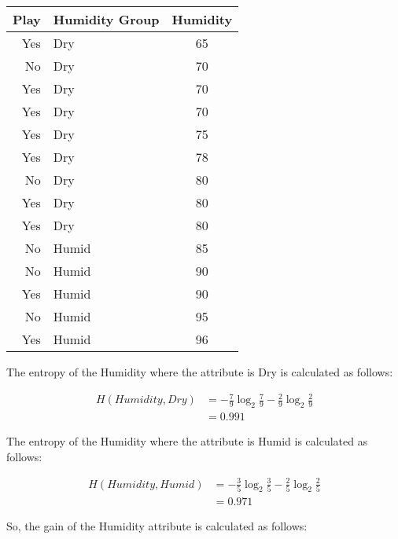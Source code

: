 \documentclass[
  11pt, %
]{assignment}
\begin{document}
\begin{center}
	\begin{tabular}{r | l | c}
		Play & Humidity Group & Humidity \\
		\toprule
		Yes  & Dry            & 65       \\
		No   & Dry            & 70       \\
		Yes  & Dry            & 70       \\
		Yes  & Dry            & 70       \\
		Yes  & Dry            & 75       \\
		Yes  & Dry            & 78       \\
		No   & Dry            & 80       \\
		Yes  & Dry            & 80       \\
		Yes  & Dry            & 80       \\
		No   & Humid          & 85       \\
		No   & Humid          & 90       \\
		Yes  & Humid          & 90       \\
		No   & Humid          & 95       \\
		Yes  & Humid          & 96       \\
	\end{tabular}
\end{center}

The entropy of the Humidity where the attribute is Dry is calculated as follows:

\begin{equation}
	\label{eq:entropy-humidity-dry}
	\begin{split}
		H(Humidity, Dry) &= -\frac{7}{9} \log_2 \frac{7}{9} - \frac{2}{9} \log_2 \frac{2}{9} \\
		&= 0.991
	\end{split}
\end{equation}

The entropy of the Humidity where the attribute is Humid is calculated as follows:

\begin{equation}
	\label{eq:entropy-humidity-humid}
	\begin{split}
		H(Humidity, Humid) &= -\frac{3}{5} \log_2 \frac{3}{5} - \frac{2}{5} \log_2 \frac{2}{5} \\
		&= 0.971
	\end{split}
\end{equation}

So, the gain of the Humidity attribute is calculated as follows:
\end{document}
